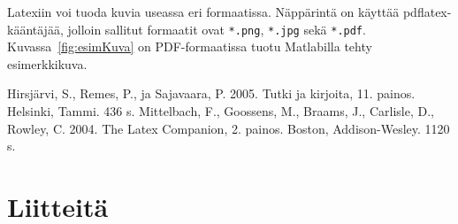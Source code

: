 \documentclass[12pt,a4paper,finnish]{vendor/tutthesis}
\begin{document}
Latexiin voi tuoda kuvia useassa eri formaatissa.
Näppärintä on käyttää pdflatex-kääntäjää, jolloin
sallitut formaatit ovat \verb+*.png+, \verb+*.jpg+
sekä \verb+*.pdf+. Kuvassa~\ref{fig:esimKuva} on
PDF-formaatissa tuotu Matlabilla tehty
esimerkkikuva.

\newpage
{} %
\renewcommand{\bibname}{Lähteet}
\begin{thebibliography}{99}
 Hirsjärvi, S., Remes, P., ja Sajavaara, P. 2005. Tutki ja
  kirjoita, 11. painos. Helsinki, Tammi. 436 s.
 Mittelbach, F., Goossens, M., Braams, J.,
Carlisle, D., Rowley, C. 2004. The Latex Companion, 2. painos. Boston, Addison-Wesley. 1120 s.

\end{thebibliography}

%
%

\appendix
\renewcommand{\chaptername}{Liite}

\chapter{Liitteitä}
\end{document}
